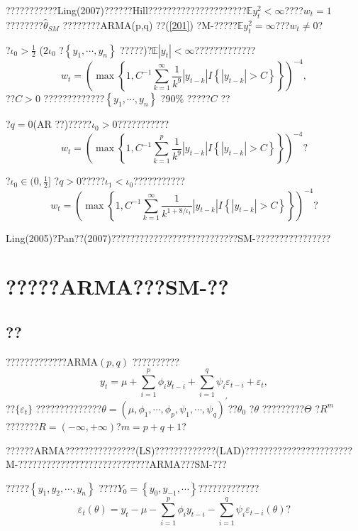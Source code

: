 \documentclass[a4paper,12pt,openany,oneside,utf-8]{ctexbook}
\begin{document}
	???????????Ling(2007)??????Hill?????????????????????$\mathbb{E}y_t^2<\infty$????$w_t=1$????????$\hat{\theta}_{SM}$ ????????ARMA(p,q) ??(\ref{201}) ?M-?????$\mathbb{E}y_t^2=\infty$???$w_t\neq0$?
	
	?$\iota_0>\frac{1}{2}$ ($2\iota_0$ ?$\left\{y_1,\cdots,y_n\right\}$ ?????)?$\mathbb{E}|y_t|<\infty$?????????????
	\begin{equation}\label{204}
		w_t=\left(\max\left\{1,C^{-1}\sum_{k=1}^\infty\frac{1}{k^9}|y_{t-k}|I\left\{|y_{t-k}|>C\right\}\right\}\right)^{-4},
	\end{equation}
	??$C>0$ ?????????????$\left\{y_1,\cdots,y_n\right\}$ ?90\% ?????$C$ ??
	
	?$q=0$(AR ??)?????$\iota_0>0$???????????
	$$w_t=\left(\max\left\{1,C^{-1}\sum_{k=1}^p\frac{1}{k^9}|y_{t-k}|I\left\{|y_{t-k}|>C\right\}\right\}\right)^{-4}\mbox{?}$$
	
	\noindent ?$\iota_0\in(0,\frac{1}{2}]$ ?$q>0$?????$\iota_1<\iota_0$???????????
	\begin{equation}\label{205}
		w_t=\left(\max\left\{1,C^{-1}\sum_{k=1}^\infty\frac{1}{k^{1+8/\iota_1}}|y_{t-k}|I\left\{|y_{t-k}|>C\right\}\right\}\right)^{-4}\mbox{?}
	\end{equation}
	
	Ling(2005)?Pan??(2007)???????????????????????????SM-????????????????
	
	\chapter[?????ARMA???SM-??]{?????ARMA???SM-??}
	\section{??}
	
	?????????????ARMA$(p,q)$ ??????????
	\begin{equation}\label{301}
		y_t=\mu+\sum_{i=1}^p\phi_i y_{t-i}+\sum_{i=1}^q\psi_i\varepsilon_{t-i}+\varepsilon_t,
	\end{equation}
	??$\{\varepsilon_t\}$ ??????????????$\theta=(\mu,\phi_1,\cdots,\phi_p,\psi_1,\cdots,\psi_q)^{\prime}$??$\theta_0$ ?$\theta$ ?????????$\Theta$ ?$R^m$???????$R=(-\infty,+\infty)$?$m=p+q+1$?
	
	??????ARMA???????????????(LS)?????????????(LAD)???????????????????????M-????????????????????????????ARMA???SM-???
	
	?????$\left\{y_1,y_2,\cdots,y_n\right\}$ ????$Y_0=\left\{y_0,y_{-1},\cdots\right\}$?????????????
	\begin{equation}\label{302}
		\varepsilon_t(\theta)=y_t-\mu-\sum_{i=1}^p\phi_iy_{t-i}-\sum_{i=1}^q\psi_i\varepsilon_{t-i}(\theta)\mbox{?}
	\end{equation}
	
\end{document}
